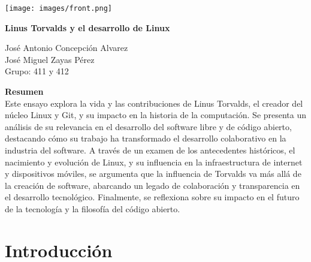 \documentclass[a4paper,12pt]{article}
\begin{document}
\renewcommand{\refname}{Bibliografía}

\begin{titlepage}
    \centering
    
    \texttt{[image: images/front.png]} %
    
    \vspace{1cm}
    \newpage
    
    {\Huge \textbf{Linus Torvalds y el desarrollo de Linux}}\\
    \vspace{0.5cm}
    
    {\Large José Antonio Concepción Alvarez \\  José Miguel Zayas Pérez \\ Grupo: 411 y 412}
    
    
   \thispagestyle{empty} 
\end{titlepage}

\begin{centering}
    \vspace{2cm}
    \textbf{Resumen}\\
    Este ensayo explora la vida y las contribuciones de Linus Torvalds, el
    creador del núcleo Linux y Git, y su impacto en la historia de la
    computación. Se presenta un análisis de su relevancia en el desarrollo del
    software libre y de código abierto, destacando cómo su trabajo ha
    transformado el desarrollo colaborativo en la industria del software. A
    través de un examen de los antecedentes históricos, el nacimiento y
    evolución de Linux, y su influencia en la infraestructura de internet y
    dispositivos móviles, se argumenta que la influencia de Torvalds va más allá
    de la creación de software, abarcando un legado de colaboración y
    transparencia en el desarrollo tecnológico. Finalmente, se reflexiona sobre
    su impacto en el futuro de la tecnología y la filosofía del código abierto.
\end{centering}
\newpage

\tableofcontents
\newpage

\section{Introducción} 
\end{document}

